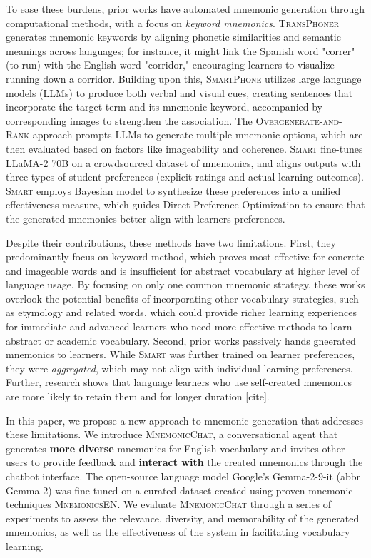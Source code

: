 \documentclass[11pt, onecolumn]{article}
\begin{document}
To ease these burdens, prior works have automated mnemonic generation through computational methods, with a focus on \textit{keyword mnemonics}. \textsc{TransPhoner} generates mnemonic keywords by aligning phonetic similarities and semantic meanings across languages; for instance, it might link the Spanish word "correr" (to run) with the English word "corridor," encouraging learners to visualize running down a corridor. Building upon this, \textsc{SmartPhone} utilizes large language models (LLMs) to produce both verbal and visual cues, creating sentences that incorporate the target term and its mnemonic keyword, accompanied by corresponding images to strengthen the association. The \textsc{Overgenerate-and-Rank} approach prompts LLMs to generate multiple mnemonic options, which are then evaluated based on factors like imageability and coherence. \textsc{Smart} fine-tunes LLaMA-2 70B on a crowdsourced dataset of mnemonics, and aligns outputs with three types of student preferences (explicit ratings and actual learning outcomes). \textsc{Smart} employs Bayesian model to synthesize these preferences into a unified effectiveness measure, which guides Direct Preference Optimization to ensure that the generated mnemonics better align with learners preferences.

Despite their contributions, these methods have two limitations. First, they predominantly focus on keyword method, which proves most effective for concrete and imageable words and is insufficient for abstract vocabulary at higher level of language usage. By focusing on only one common mnemonic strategy, these works overlook the potential benefits of incorporating other vocabulary strategies, such as etymology and related words, which could provide richer learning experiences for immediate and
advanced learners who need more effective methods to learn abstract or academic vocabulary. Second, prior works passively hands gneerated mnemonics to learners. While \textsc{Smart} was further trained on learner preferences, they were \textit{aggregated}, which may not align with individual learning preferences. Further, research shows that language learners who use self-created mnemonics are more likely to retain them and for longer duration [cite].

In this paper, we propose a new approach to mnemonic generation that addresses these limitations. We introduce \textsc{MnemonicChat}, a conversational agent that generates \textbf{more diverse} mnemonics for English vocabulary and invites other users to provide feedback and \textbf{interact with} the created mnemonics through the chatbot interface. The open-source language model Google's Gemma-2-9-it (abbr Gemma-2) was fine-tuned on a curated dataset created using proven mnemonic techniques \textsc{MnemonicsEN}. We evaluate \textsc{MnemonicChat} through a series of experiments to assess the relevance, diversity, and memorability of the generated mnemonics, as well as the effectiveness of the system in facilitating vocabulary learning.
\end{document}
